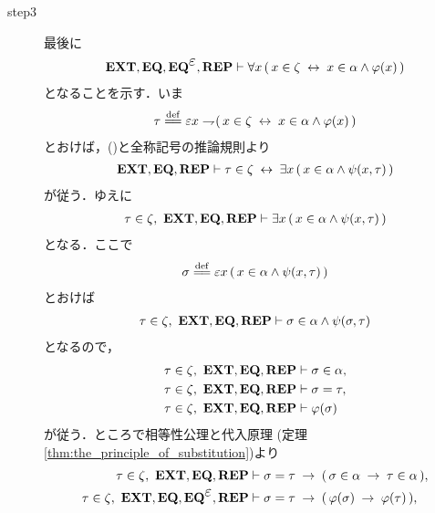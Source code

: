 \begin{sketch}
\begin{description}
			\item[step3]
				最後に
				\begin{align}
					\EXTAX,\EQAX,\EQAXEP,\REPAX \vdash \forall x\,
					(\, x \in \zeta \lrarrow x \in \alpha \wedge \varphi(x)\, )
					\label{fom:thm_axiom_of_separation_8}
				\end{align}
				となることを示す．いま
				\begin{align}
					\tau \defeq \varepsilon x \negation
					(\, x \in \zeta \lrarrow x \in \alpha \wedge \varphi(x)\, )
				\end{align}
				とおけば，()と全称記号の推論規則より
				\begin{align}
					\mbox{{\bf EXT}},\mbox{{\bf EQ}},\mbox{{\bf REP}} \vdash 
					\tau \in \zeta \hspace{0.25em}\leftrightarrow\hspace{0.25em} \exists x\, (\, x \in \alpha \wedge 
					\psi(x,\tau)\, )
					\label{fom:thm_axiom_of_separation_5}
				\end{align}
				が従う．ゆえに
				\begin{align}
					\tau \in \zeta,\ \mbox{{\bf EXT}},\mbox{{\bf EQ}},\mbox{{\bf REP}} \vdash
					\exists x\, (\, x \in \alpha \wedge \psi(x,\tau)\, )
				\end{align}
				となる．ここで
				\begin{align}
					\sigma \defeq \varepsilon x\, (\, x \in \alpha \wedge
					\psi(x,\tau)\, )
				\end{align}
				とおけば
				\begin{align}
					\tau \in \zeta,\ \mbox{{\bf EXT}},\mbox{{\bf EQ}},\mbox{{\bf REP}} \vdash
					\sigma \in \alpha \wedge \psi(\sigma,\tau)
				\end{align}
				となるので，
				\begin{align}
					\tau \in \zeta,\ \mbox{{\bf EXT}},\mbox{{\bf EQ}},\mbox{{\bf REP}} &\vdash \sigma \in \alpha, \\
					\tau \in \zeta,\ \mbox{{\bf EXT}},\mbox{{\bf EQ}},\mbox{{\bf REP}} &\vdash \sigma = \tau, \\
					\tau \in \zeta,\ \mbox{{\bf EXT}},\mbox{{\bf EQ}},\mbox{{\bf REP}} &\vdash \varphi(\sigma)
				\end{align}
				が従う．ところで相等性公理と代入原理
				(定理\ref{thm:the_principle_of_substitution})より
				\begin{align}
					\tau \in \zeta,\ \EXTAX,\EQAX,\REPAX &\vdash 
						\sigma = \tau \rarrow (\, \sigma \in \alpha \rarrow
						\tau \in \alpha\, ), \\
					\tau \in \zeta,\ \EXTAX,\EQAX,\EQAXEP,\REPAX &\vdash
						\sigma = \tau \rarrow (\, \varphi(\sigma) \rarrow
						\varphi(\tau)\, ), 
						\label{fom:thm_axiom_of_separation_9} \\
				\end{align}

\end{description}
\end{sketch}
